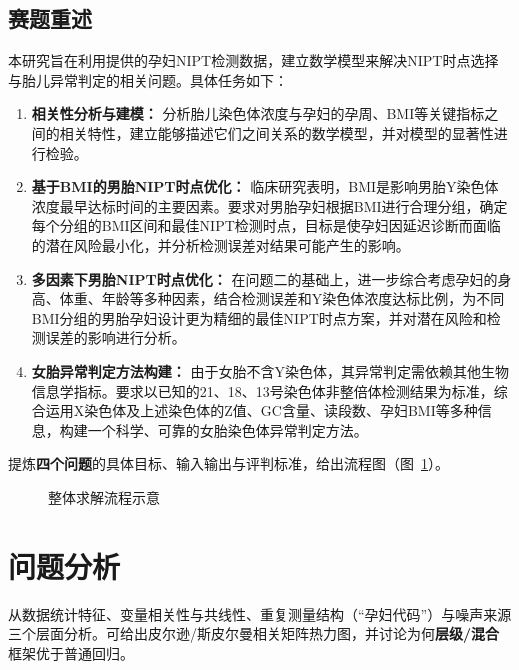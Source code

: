 \documentclass[12pt,a4paper]{ctexart}
\numberwithin{equation}{section}
\theoremstyle{mcm}
\begin{document}
\subsection{赛题重述}
本研究旨在利用提供的孕妇NIPT检测数据，建立数学模型来解决NIPT时点选择与胎儿异常判定的相关问题。具体任务如下：
\begin{enumerate}
    \item \textbf{相关性分析与建模：} 分析胎儿染色体浓度与孕妇的孕周、BMI等关键指标之间的相关特性，建立能够描述它们之间关系的数学模型，并对模型的显著性进行检验。
    \item \textbf{基于BMI的男胎NIPT时点优化：} 临床研究表明，BMI是影响男胎Y染色体浓度最早达标时间的主要因素。要求对男胎孕妇根据BMI进行合理分组，确定每个分组的BMI区间和最佳NIPT检测时点，目标是使孕妇因延迟诊断而面临的潜在风险最小化，并分析检测误差对结果可能产生的影响。
    \item \textbf{多因素下男胎NIPT时点优化：} 在问题二的基础上，进一步综合考虑孕妇的身高、体重、年龄等多种因素，结合检测误差和Y染色体浓度达标比例，为不同BMI分组的男胎孕妇设计更为精细的最佳NIPT时点方案，并对潜在风险和检测误差的影响进行分析。
    \item \textbf{女胎异常判定方法构建：} 由于女胎不含Y染色体，其异常判定需依赖其他生物信息学指标。要求以已知的21、18、13号染色体非整倍体检测结果为标准，综合运用X染色体及上述染色体的Z值、GC含量、读段数、孕妇BMI等多种信息，构建一个科学、可靠的女胎染色体异常判定方法。
\end{enumerate}



提炼\textbf{四个问题}的具体目标、输入输出与评判标准，给出流程图（图~\ref{fig:flow}）。
\begin{figure}[H]
  \centering
  \caption{整体求解流程示意}
  \label{fig:flow}
\end{figure}

\section{问题分析}
从数据统计特征、变量相关性与共线性、重复测量结构（“孕妇代码”）与噪声来源三个层面分析。可给出皮尔逊/斯皮尔曼相关矩阵热力图，并讨论为何\textbf{层级/混合}框架优于普通回归。

\end{document}
